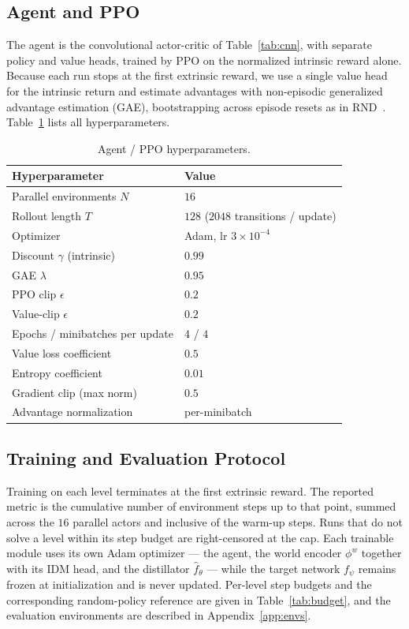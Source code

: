 \documentclass{article}
\begin{document}
\subsection{Agent and PPO}
\label{app:ppo}
The agent is the convolutional actor-critic of Table~\ref{tab:cnn}, with separate
policy and value heads, trained by PPO on the normalized intrinsic reward alone.
Because each run stops at the first extrinsic reward, we use a single value head
for the intrinsic return and estimate advantages with non-episodic generalized
advantage estimation (GAE), bootstrapping across episode resets as in
RND~\citep{burda_exploration_2018}. Table~\ref{tab:ppo} lists all hyperparameters.

\begin{table}[h]
\centering
\caption{Agent / PPO hyperparameters.}
\label{tab:ppo}
\begin{tabular}{ll}
\toprule
Hyperparameter & Value \\
\midrule
Parallel environments $N$ & $16$ \\
Rollout length $T$ & $128$ ($2048$ transitions / update) \\
Optimizer & Adam, lr $3\times10^{-4}$ \\
Discount $\gamma$ (intrinsic) & $0.99$ \\
GAE $\lambda$ & $0.95$ \\
PPO clip $\epsilon$ & $0.2$ \\
Value-clip $\epsilon$ & $0.2$ \\
Epochs / minibatches per update & $4$ / $4$ \\
Value loss coefficient & $0.5$ \\
Entropy coefficient & $0.01$ \\
Gradient clip (max norm) & $0.5$ \\
Advantage normalization & per-minibatch \\
\bottomrule
\end{tabular}
\end{table}

\subsection{Training and Evaluation Protocol}
\label{app:protocol}
Training on each level terminates at the first extrinsic reward. The reported
metric is the cumulative number of environment steps up to that point, summed
across the $16$ parallel actors and inclusive of the warm-up steps. Runs that do
not solve a level within its step budget are right-censored at the cap. Each
trainable module uses its own Adam optimizer --- the agent, the world encoder
$\phi^w$ together with its IDM head, and the distillator $\hat f_\theta$ ---
while the target network $f_\psi$ remains frozen at initialization and is never
updated. Per-level step budgets and the corresponding random-policy reference are
given in Table~\ref{tab:budget}, and the evaluation environments are described in
Appendix~\ref{app:envs}.
\end{document}
